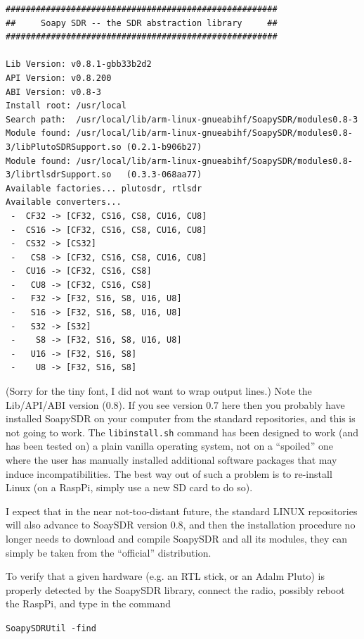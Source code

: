 \documentclass[12pt]{book}
\def\grtt#1{\texttt{\color{magenta}#1}}
\begin{document}
\begin{tiny}
\begin{verbatim}
######################################################
##     Soapy SDR -- the SDR abstraction library     ##
######################################################

Lib Version: v0.8.1-gbb33b2d2
API Version: v0.8.200
ABI Version: v0.8-3
Install root: /usr/local
Search path:  /usr/local/lib/arm-linux-gnueabihf/SoapySDR/modules0.8-3
Module found: /usr/local/lib/arm-linux-gnueabihf/SoapySDR/modules0.8-3/libPlutoSDRSupport.so (0.2.1-b906b27)
Module found: /usr/local/lib/arm-linux-gnueabihf/SoapySDR/modules0.8-3/librtlsdrSupport.so   (0.3.3-068aa77)
Available factories... plutosdr, rtlsdr
Available converters...
 -  CF32 -> [CF32, CS16, CS8, CU16, CU8]
 -  CS16 -> [CF32, CS16, CS8, CU16, CU8]
 -  CS32 -> [CS32]
 -   CS8 -> [CF32, CS16, CS8, CU16, CU8]
 -  CU16 -> [CF32, CS16, CS8]
 -   CU8 -> [CF32, CS16, CS8]
 -   F32 -> [F32, S16, S8, U16, U8]
 -   S16 -> [F32, S16, S8, U16, U8]
 -   S32 -> [S32]
 -    S8 -> [F32, S16, S8, U16, U8]
 -   U16 -> [F32, S16, S8]
 -    U8 -> [F32, S16, S8]
\end{verbatim}
\end{tiny}

(Sorry for the tiny font, I did not want to wrap output lines.)
Note the Lib/API/ABI version (0.8). If you see version 0.7 here
then you probably have installed SoapySDR on your computer
from the standard repositories, and this is not going to work.
The \texttt{libinstall.sh} command  has been designed
to work (and has been tested on) a plain vanilla operating system, not on a ``spoiled'' one
where the user has manually installed additional software packages that may induce incompatibilities.
The best way out of such a problem is to re-install Linux (on a RaspPi, simply use a new SD card to do so).

I expect that in the near not-too-distant future, the standard LINUX
repositories will also advance to SoaySDR version 0.8, and then
the installation procedure no longer needs to download and compile SoapySDR and all
its modules, they can simply be taken from the ``official'' distribution.

\bigskip

To verify that a given hardware (e.g. an RTL stick, or an Adalm Pluto) is properly detected by the
SoapySDR library, connect the radio, possibly reboot the RaspPi, and type in the command

\grtt{SoapySDRUtil -find}
\end{document}

